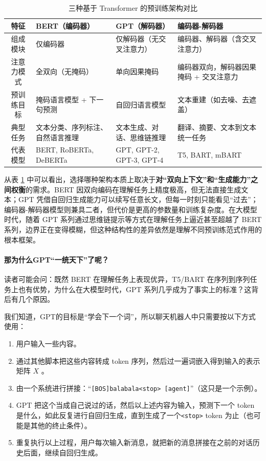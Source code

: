 \begin{table}
    \centering\small
    \begin{tabular}{c|p{4cm}p{4cm}p{4cm}}
        \toprule
        \textbf{特征} & \textbf{BERT（编码器）} & \textbf{GPT（解码器）} & \textbf{编码器-解码器} \\
        \midrule
        组成模块 & 仅编码器 & 仅解码器（无交叉注意力） & 编码器、解码器（含交叉注意力） \\
        注意力模式 & 全双向（无掩码）& 单向因果掩码 & 编码器双向，解码器因果掩码 + 交叉注意力 \\
        预训练目标 & 掩码语言模型 + 下一句预测 & 自回归语言模型 & 文本重建（如去噪、去遮盖） \\
        典型任务 & 文本分类、序列标注、自然语言推理 & 文本生成、对话、思维链推理 & 翻译、摘要、文本到文本统一任务 \\
        代表模型 & BERT, RoBERTa, DeBERTa & GPT, GPT-2, GPT-3, GPT-4 & T5, BART, mBART \\
        \bottomrule
    \end{tabular}
    \caption{三种基于 Transformer 的预训练架构对比}
    \label{tab:bert_gpt_comparison}
\end{table}

从表 \cref{tab:bert_gpt_comparison} 中可以看出，选择哪种架构本质上取决于\textbf{对“双向上下文”和“生成能力”之间权衡}的需求。BERT 因双向编码在理解任务上精度极高，但无法直接生成文本；GPT 凭借自回归生成能力可以续写任意长文，但每一时刻只能看见“过去”；编码器-解码器模型则兼具二者，但代价是更高的参数量和训练复杂度。在大模型时代，随着 GPT 系列通过思维链提示等方式在理解任务上逼近甚至超越了 BERT 系列，边界正在变得模糊，但这种结构性的差异依然是理解不同预训练范式作用的根本框架。

\paragraph{那为什么GPT“一统天下”了呢？} 读者可能会问：既然 BERT 在理解任务上表现优异，T5/BART 在序列到序列任务上也有优势，为什么在大模型时代，GPT 系列几乎成为了事实上的标准？这背后有几个原因。

我们知道，GPT的目标是“学会下一个词”，所以聊天机器人中只需要按以下方式使用：
\begin{enumerate}
    \item 用户输入一些内容。
    \item 通过其他脚本把这些内容转成 token 序列，然后过一遍词嵌入得到输入的表示矩阵 $X$ 。
    \item 由一个系统进行拼接：“\verb|[BOS]balabala<stop> [agent]|”（这只是一个示例）。
    \item GPT 把这个当成自己说过的话，然后以上述内容为输入，预测下一个 token 是什么，如此反复进行自回归生成，直到生成了一个\verb|<stop>| token 为止（也可能是其他的终止条件）。
    \item 重复执行以上过程，用户每次输入新消息，就把新的消息拼接在之前的对话历史后面，继续自回归生成。
\end{enumerate}

